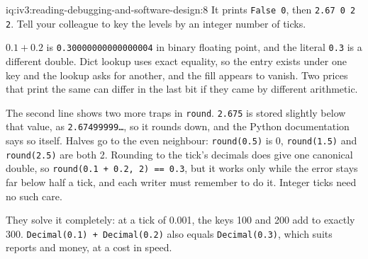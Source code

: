 \begin{solution}{iq:iv3:reading-debugging-and-software-design:8}
It prints \texttt{False 0}, then \texttt{2.67 0 2 2}. Tell your colleague to key the levels by an integer number of ticks.

$0.1 + 0.2$ is \texttt{0.30000000000000004} in binary floating point, and the literal \texttt{0.3} is a different double. Dict lookup uses exact equality, so the entry exists under one key and the lookup asks for another, and the fill appears to vanish. Two prices that print the same can differ in the last bit if they came by different arithmetic.

The second line shows two more traps in \texttt{round}. \texttt{2.675} is stored slightly below that value, as \texttt{2.67499999\dots}, so it rounds down, and the Python documentation says so itself. Halves go to the even neighbour: \texttt{round(0.5)} is 0, \texttt{round(1.5)} and \texttt{round(2.5)} are both 2. Rounding to the tick's decimals does give one canonical double, so \texttt{round(0.1 + 0.2, 2) == 0.3}, but it works only while the error stays far below half a tick, and each writer must remember to do it. Integer ticks need no such care.

They solve it completely: at a tick of 0.001, the keys 100 and 200 add to exactly 300. \texttt{Decimal(\textquotedbl{}0.1\textquotedbl{}) + Decimal(\textquotedbl{}0.2\textquotedbl{})} also equals \texttt{Decimal(\textquotedbl{}0.3\textquotedbl{})}, which suits reports and money, at a cost in speed.


\end{solution}

